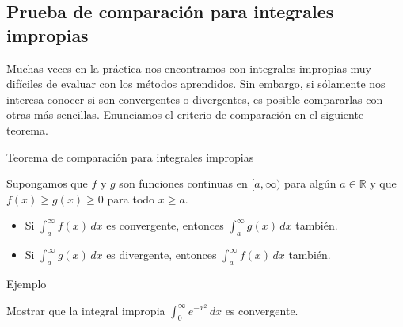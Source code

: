 \documentclass[
  letterpaper,
]{book}
\theoremstyle{plain}
\theoremstyle{remark}
\begin{document}
\subsection{Prueba de comparación para integrales
impropias}\label{prueba-de-comparaciuxf3n-para-integrales-impropias}

Muchas veces en la práctica nos encontramos con integrales impropias muy
difíciles de evaluar con los métodos aprendidos. Sin embargo, si
sólamente nos interesa conocer si son convergentes o divergentes, es
posible compararlas con otras más sencillas. Enunciamos el criterio de
comparación en el siguiente teorema.

\label{teo-comparacion}
Teorema de comparación para integrales impropias

Supongamos que \(f\) y \(g\) son funciones continuas en \([a,\infty)\)
para algún \(a\in\mathbb{R}\) y que \(f(x)\geq g(x)\geq 0\) para todo
\(x\geq a\).

\begin{itemize}
\item
  Si \(\displaystyle \int_a^\infty f(x)\,dx\) es convergente, entonces
  \(\displaystyle \int_a^\infty g(x)\,dx\) también.
\item
  Si \(\displaystyle \int_a^\infty g(x)\,dx\) es divergente, entonces
  \(\displaystyle \int_a^\infty f(x)\,dx\) también.
\end{itemize}

Ejemplo

Mostrar que la integral impropia
\(\displaystyle \int_{0}^{\infty}e^{-x^2}\,dx\) es convergente.
\end{document}
